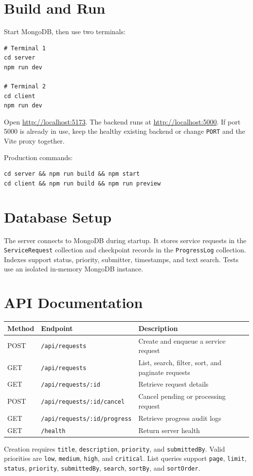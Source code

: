 \documentclass[11pt,a4paper]{article}
\begin{document}
\section{Build and Run}
Start MongoDB, then use two terminals:
\begin{verbatim}
# Terminal 1
cd server
npm run dev

# Terminal 2
cd client
npm run dev
\end{verbatim}
Open \url{http://localhost:5173}. The backend runs at \url{http://localhost:5000}. If port 5000 is already in use, keep the healthy existing backend or change \texttt{PORT} and the Vite proxy together.

Production commands:
\begin{verbatim}
cd server && npm run build && npm start
cd client && npm run build && npm run preview
\end{verbatim}

\section{Database Setup}
The server connects to MongoDB during startup. It stores service requests in the \texttt{ServiceRequest} collection and checkpoint records in the \texttt{ProgressLog} collection. Indexes support status, priority, submitter, timestamps, and text search. Tests use an isolated in-memory MongoDB instance.

\section{API Documentation}
\begin{longtable}{p{}p{}p{}}
\toprule Method & Endpoint & Description\\\midrule
POST & \texttt{/api/requests} & Create and enqueue a service request\\
GET & \texttt{/api/requests} & List, search, filter, sort, and paginate requests\\
GET & \texttt{/api/requests/:id} & Retrieve request details\\
POST & \texttt{/api/requests/:id/cancel} & Cancel pending or processing request\\
GET & \texttt{/api/requests/:id/progress} & Retrieve progress audit logs\\
GET & \texttt{/health} & Return server health\\
\bottomrule
\end{longtable}
Creation requires \texttt{title}, \texttt{description}, \texttt{priority}, and \texttt{submittedBy}. Valid priorities are \texttt{low}, \texttt{medium}, \texttt{high}, and \texttt{critical}. List queries support \texttt{page}, \texttt{limit}, \texttt{status}, \texttt{priority}, \texttt{submittedBy}, \texttt{search}, \texttt{sortBy}, and \texttt{sortOrder}.
\end{document}
